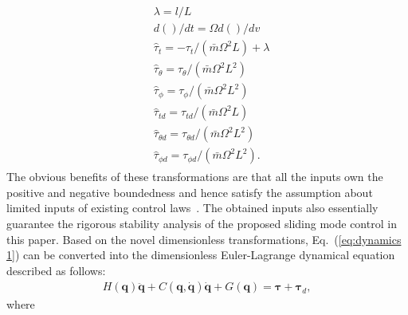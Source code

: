 \documentclass[3p]{elsarticle}
\theoremstyle{plain}
\theoremstyle{remark}
\begin{document}
{\begin{align}
\begin{split}
&\lambda=l/L\\
&d()/dt=\Omega d()/dv\\
&\hat{\tau}_t=-\tau_t/(\bar{m}\Omega^2L)+\lambda\\
&\hat{\tau}_\theta=\tau_\theta/(\bar{m}\Omega^2L^2)\\
&\hat{\tau}_\phi = \tau_\phi/(\bar{m}\Omega^2L^2)\\
&\hat{\tau}_{td}=\tau_{td}/(\bar{m}\Omega^2L)\\
&\hat{\tau}_{\theta d}=\tau_{\theta d}/(\bar{m}\Omega^2L^2)\\
&\hat{\tau}_{\phi d}= \tau_{\phi d}/(\bar{m}\Omega^2L^2)\label{eq:varcon}.
\end{split}
\end{align}
The obvious benefits of these transformations are that all the inputs own the positive and negative boundedness and hence satisfy the assumption about limited inputs of existing control laws~\cite{Hu2008552,6060930}. The obtained inputs also essentially guarantee the rigorous stability analysis of the proposed sliding mode control in this paper. Based on the novel dimensionless transformations, Eq.~(\ref{eq:dynamics 1}) can be converted into the dimensionless Euler-Lagrange dynamical equation described as follows:}
\begin{align}
H(\bm q)\ddot {\bm q}+C(\bm q,\dot{\bm q})\dot{\bm q}+G(\bm q) = \bm\tau+\bm\tau_d,\label{eq:dynamic model}
\end{align}
where
\end{document}

